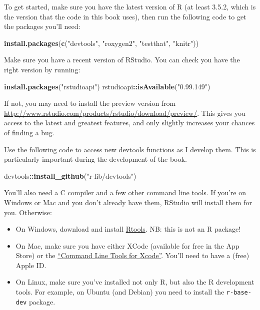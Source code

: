 \documentclass[]{book}
\newenvironment{Shaded}{\begin{snugshade}}{\end{snugshade}}
\newcommand{\KeywordTok}[1]{\textcolor[rgb]{0.13,0.29,0.53}{\textbf{#1}}}
\newcommand{\NormalTok}[1]{#1}
\newcommand{\OperatorTok}[1]{\textcolor[rgb]{0.81,0.36,0.00}{\textbf{#1}}}
\newcommand{\StringTok}[1]{\textcolor[rgb]{0.31,0.60,0.02}{#1}}
\begin{document}
To get started, make sure you have the latest version of R (at least 3.5.2, which is the version that the code in this book uses), then run the following code to get the packages you'll need:

\begin{Shaded}
\begin{Highlighting}[]
\KeywordTok{install.packages}\NormalTok{(}\KeywordTok{c}\NormalTok{(}\StringTok{"devtools"}\NormalTok{, }\StringTok{"roxygen2"}\NormalTok{, }\StringTok{"testthat"}\NormalTok{, }\StringTok{"knitr"}\NormalTok{))}
\end{Highlighting}
\end{Shaded}

Make sure you have a recent version of RStudio. You can check you have the right version by running:

\begin{Shaded}
\begin{Highlighting}[]
\KeywordTok{install.packages}\NormalTok{(}\StringTok{"rstudioapi"}\NormalTok{)}
\NormalTok{rstudioapi}\OperatorTok{::}\KeywordTok{isAvailable}\NormalTok{(}\StringTok{"0.99.149"}\NormalTok{)}
\end{Highlighting}
\end{Shaded}

If not, you may need to install the preview version from \url{http://www.rstudio.com/products/rstudio/download/preview/}. This gives you access to the latest and greatest features, and only slightly increases your chances of finding a bug.

Use the following code to access new devtools functions as I develop them. This is particularly important during the development of the book.

\begin{Shaded}
\begin{Highlighting}[]
\NormalTok{devtools}\OperatorTok{::}\KeywordTok{install_github}\NormalTok{(}\StringTok{"r-lib/devtools"}\NormalTok{)}
\end{Highlighting}
\end{Shaded}

You'll also need a C compiler and a few other command line tools. If you're on Windows or Mac and you don't already have them, RStudio will install them for you. Otherwise:

\begin{itemize}
\item
  On Windows, download and install \href{http://cran.r-project.org/bin/windows/Rtools/}{Rtools}.
  NB: this is not an R package!
\item
  On Mac, make sure you have either XCode (available for free in the App Store)
  or the \href{http://developer.apple.com/downloads}{``Command Line Tools for Xcode''}.
  You'll need to have a (free) Apple ID.
\item
  On Linux, make sure you've installed not only R, but also the R development
  tools. For example, on Ubuntu (and Debian) you need to install the
  \texttt{r-base-dev} package.
\end{itemize}
\end{document}
